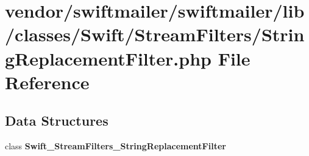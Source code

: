\section{vendor/swiftmailer/swiftmailer/lib/classes/\+Swift/\+Stream\+Filters/\+String\+Replacement\+Filter.php File Reference}
\label{_string_replacement_filter_8php}
\subsection*{Data Structures}
\begin{DoxyCompactItemize}
\item 
class {\bf Swift\+\_\+\+Stream\+Filters\+\_\+\+String\+Replacement\+Filter}
\end{DoxyCompactItemize}
